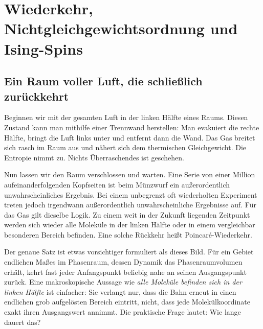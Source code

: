 \chapter{Wiederkehr, Nichtgleichgewichtsordnung und Ising-Spins}


\section{Ein Raum voller Luft, die schließlich zurückkehrt}

Beginnen wir mit der gesamten Luft in der linken Hälfte eines Raums. Diesen Zustand kann man mithilfe einer Trennwand herstellen: Man evakuiert die rechte Hälfte, bringt die Luft links unter und entfernt dann die Wand. Das Gas breitet sich rasch im Raum aus und nähert sich dem thermischen Gleichgewicht. Die Entropie nimmt zu. Nichts Überraschendes ist geschehen.

Nun lassen wir den Raum verschlossen und warten. Eine Serie von einer Million aufeinanderfolgenden Kopfseiten ist beim Münzwurf ein außerordentlich unwahrscheinliches Ergebnis. Bei einem unbegrenzt oft wiederholten Experiment treten jedoch irgendwann außerordentlich unwahrscheinliche Ergebnisse auf. Für das Gas gilt dieselbe Logik. Zu einem weit in der Zukunft liegenden Zeitpunkt werden sich wieder alle Moleküle in der linken Hälfte oder in einem vergleichbar besonderen Bereich befinden. Eine solche Rückkehr heißt Poincaré-Wiederkehr.

Der genaue Satz ist etwas vorsichtiger formuliert als dieses Bild. Für ein Gebiet endlichen Maßes im Phasenraum, dessen Dynamik das Phasenraumvolumen erhält, kehrt fast jeder Anfangspunkt beliebig nahe an seinen Ausgangspunkt zurück. Eine makroskopische Aussage wie \emph{alle Moleküle befinden sich in der linken Hälfte} ist einfacher: Sie verlangt nur, dass die Bahn erneut in einen endlichen grob aufgelösten Bereich eintritt, nicht, dass jede Molekülkoordinate exakt ihren Ausgangswert annimmt. Die praktische Frage lautet: Wie lange dauert das?

